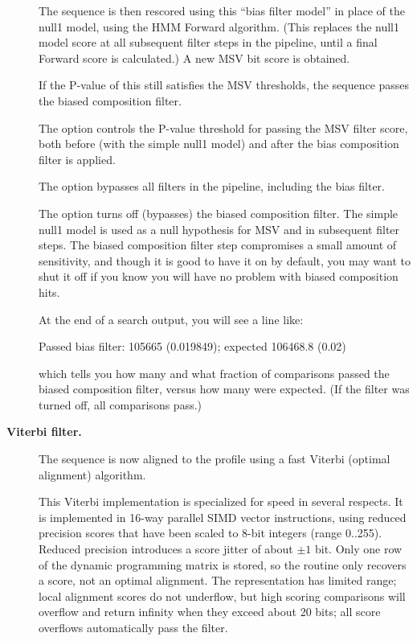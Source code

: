 \begin{description}
 The sequence is then rescored using this ``bias filter model'' in
 place of the null1 model, using the HMM Forward algorithm. (This
 replaces the null1 model score at all subsequent filter steps in the
 pipeline, until a final Forward score is calculated.) A new MSV bit
 score is obtained.

 If the P-value of this still satisfies the MSV thresholds, the
 sequence passes the biased composition filter. 

 The  option controls the P-value threshold for
 passing the MSV filter score, both before (with the simple null1
 model) and after the bias composition filter is applied.

 The  option bypasses all filters in the pipeline,
 including the bias filter.

 The  option turns off (bypasses) the biased
 composition filter.  The simple null1 model is used as a null
 hypothesis for MSV and in subsequent filter steps. The biased
 composition filter step compromises a small amount of sensitivity,
 and though it is good to have it on by default, you may want to shut
 it off if you know you will have no problem with biased composition
 hits.

 At the end of a search output, you will see a line like:

\begin{sreoutput}
 Passed bias filter:                   105665  (0.019849); expected 106468.8 (0.02)
\end{sreoutput}

 which tells you how many and what fraction of comparisons passed the
 biased composition filter, versus how many were expected. (If the
 filter was turned off, all comparisons pass.)

\item[\textbf{Viterbi filter.}]
 The sequence is now aligned to the profile using a fast Viterbi
 (optimal alignment) algorithm. 

 This Viterbi implementation is specialized for speed in several
 respects. It is implemented in 16-way parallel SIMD vector
 instructions, using reduced precision scores that have been scaled to
 8-bit integers (range 0..255). Reduced precision introduces a score
 jitter of about $\pm 1$ bit. Only one row of the dynamic programming
 matrix is stored, so the routine only recovers a score, not an
 optimal alignment. The representation has limited range; local
 alignment scores do not underflow, but high scoring comparisons will
 overflow and return infinity when they exceed about 20 bits; all
 score overflows automatically pass the filter.


\end{description}
